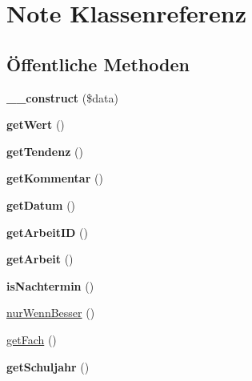 \hypertarget{class_note}{}\section{Note Klassenreferenz}
\label{class_note}
\subsection*{Öffentliche Methoden}
\begin{DoxyCompactItemize}
\item 
\mbox{\label{class_note_afebc4f5ab9360b4d40545201f4147290}} 
{\bfseries \+\_\+\+\_\+construct} (\$data)
\item 
\mbox{\label{class_note_afd96d217790c1de5963601d130f3f22a}} 
{\bfseries get\+Wert} ()
\item 
\mbox{\label{class_note_ae0e65b926e8154ebe9dc4f3f7918a18c}} 
{\bfseries get\+Tendenz} ()
\item 
\mbox{\label{class_note_a9c933091cf32938d79dc49732c39a68c}} 
{\bfseries get\+Kommentar} ()
\item 
\mbox{\label{class_note_afc1a39df8895df3b1b52737c368cb8b3}} 
{\bfseries get\+Datum} ()
\item 
\mbox{\label{class_note_ad453af2cd7a4ddedef4f9a85f808944d}} 
{\bfseries get\+Arbeit\+ID} ()
\item 
\mbox{\label{class_note_ad521a74a4baf3db4cf22786fed098490}} 
{\bfseries get\+Arbeit} ()
\item 
\mbox{\label{class_note_aba2a1b55ced74fcf38dbc26e97a96faf}} 
{\bfseries is\+Nachtermin} ()
\item 
\mbox{\hyperlink{class_note_ad194ac7e3251b7f468f88422412edfc5}{nur\+Wenn\+Besser}} ()
\item 
\mbox{\hyperlink{class_note_a0775c076ad1e5757cebe6780824402a7}{get\+Fach}} ()
\item 
\mbox{\label{class_note_a231a7cc5ea0c9b46ce2e6e3dd71ed140}} 
{\bfseries get\+Schuljahr} ()
\item 
\mbox{\label{class_note_a02a37fa85ba54951116533823ad30bbb}} 

\end{DoxyCompactItemize}

